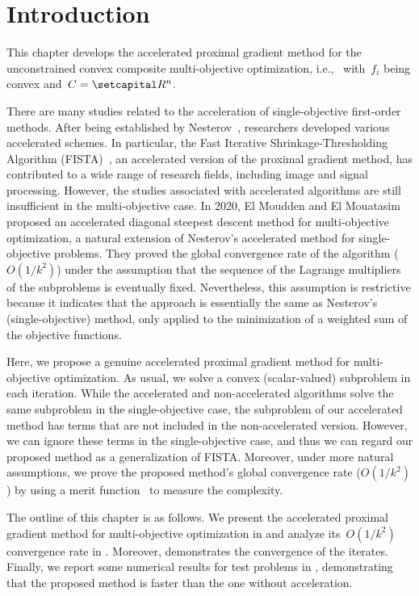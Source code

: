 \documentclass[../main]{subfiles}
\begin{document}
\section{Introduction}
This chapter develops the accelerated proximal gradient method for the unconstrained convex composite multi-objective optimization, i.e.,~ with~$f_i$ being convex and~$C = \setR^n$.

There are many studies related to the acceleration of single-objective first-order methods.
After being established by Nesterov~\cite{Nesterov1983}, researchers developed various accelerated schemes.
In particular, the Fast Iterative Shrinkage-Thresholding Algorithm (FISTA)~\cite{Beck2009}, an accelerated version of the proximal gradient method, has contributed to a wide range of research fields, including image and signal processing.
However, the studies associated with accelerated algorithms are still insufficient in the multi-objective case.
In 2020, El Moudden and El Mouatasim~\cite{ElMoudden2020} proposed an accelerated diagonal steepest descent method for multi-objective optimization, a natural extension of Nesterov's accelerated method for single-objective problems.
They proved the global convergence rate of the algorithm ($O(1 / k^2)$) under the assumption that the sequence of the Lagrange multipliers of the subproblems is eventually fixed.
Nevertheless, this assumption is restrictive because it indicates that the approach is essentially the same as Nesterov's (single-objective) method, only applied to the minimization of a weighted sum of the objective functions.

Here, we propose a genuine accelerated proximal gradient method for multi-objective optimization.
As usual, we solve a convex (scalar-valued) subproblem in each iteration.
While the accelerated and non-accelerated algorithms solve the same subproblem in the single-objective case, the subproblem of our accelerated method has terms that are not included in the non-accelerated version.
However, we can ignore these terms in the single-objective case, and thus we can regard our proposed method as a generalization of FISTA.
Moreover, under more natural assumptions, we prove the proposed method's global convergence rate ($O(1/k^2)$) by using a merit function~ to measure the complexity.

The outline of this chapter is as follows.
We present the accelerated proximal gradient method for multi-objective optimization in  and analyze its~$O(1 / k^2)$ convergence rate in .
Moreover,  demonstrates the convergence of the iterates.
Finally, we report some numerical results for test problems in , demonstrating that the proposed method is faster than the one without acceleration.
\end{document}
